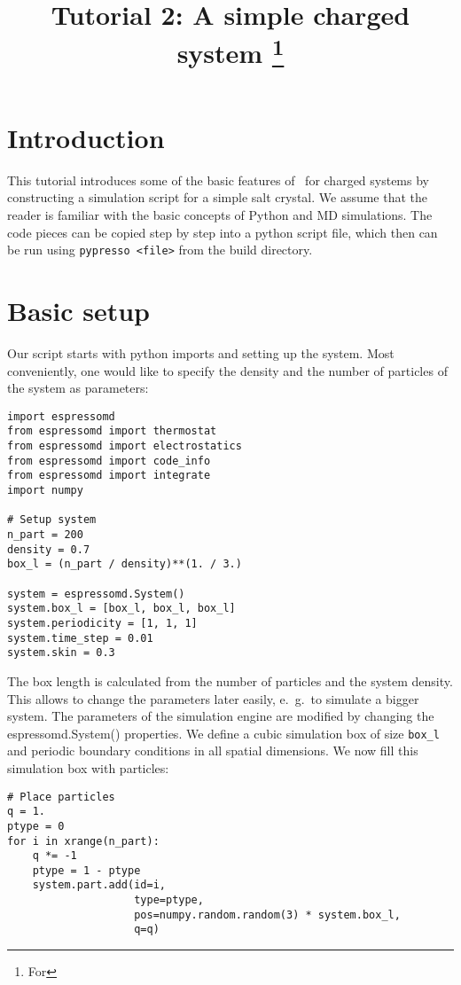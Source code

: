 \documentclass[
a4paper,                        %
11pt,                           %
twoside,                        %
footsepline,                    %
headsepline,                    %
headexclude,                    %
footexclude,                    %
pagesize,                       %
]{scrartcl}
\begin{document}
\esptitlehead
\title{Tutorial 2: A simple charged system%
\ifdefined\esversion%
\thanks{For \es \esversion}%
\fi%
}

\maketitle
\tableofcontents

\section{Introduction}

This tutorial introduces some of the basic features of \es\ for charged systems
by constructing a simulation script for a simple salt crystal. We assume that
the reader is familiar with the basic concepts of Python and MD simulations. The
code pieces can be copied step by step into a python script file, which then can
be run using \verb|pypresso <file>| from the \es build directory.

\section{Basic setup}

Our script starts with python imports and setting up the system.
Most conveniently, one would like to specify the density and the number of
particles of the system as parameters:

\begin{lstlisting}
import espressomd
from espressomd import thermostat
from espressomd import electrostatics
from espressomd import code_info
from espressomd import integrate
import numpy

# Setup system 
n_part = 200
density = 0.7
box_l = (n_part / density)**(1. / 3.)

system = espressomd.System()
system.box_l = [box_l, box_l, box_l]
system.periodicity = [1, 1, 1]
system.time_step = 0.01
system.skin = 0.3
\end{lstlisting}

The box length is calculated from the number of particles and the system
density. This allows to change the parameters later easily, e.~g.\ to simulate a
bigger system. The parameters of the simulation engine are modified by changing the
espressomd.System() properties. We define a cubic simulation box of size 
\verb|box_l| and periodic boundary conditions in all spatial dimensions. 
We now fill this simulation box with particles:

\begin{lstlisting}
# Place particles
q = 1.
ptype = 0
for i in xrange(n_part):
    q *= -1
    ptype = 1 - ptype
    system.part.add(id=i, 
                    type=ptype, 
                    pos=numpy.random.random(3) * system.box_l, 
                    q=q)
\end{lstlisting}
\end{document}
